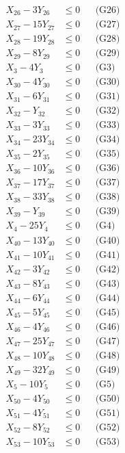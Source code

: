 \documentclass[a4paper,10pt]{article}
\begin{document}
{\begin{align}
X_{26} - 3Y_{26} &\leq 0 && \text{(G26)} \\
X_{27} - 15Y_{27} &\leq 0 && \text{(G27)} \\
X_{28} - 19Y_{28} &\leq 0 && \text{(G28)} \\
\allowbreak
X_{29} - 8Y_{29} &\leq 0 && \text{(G29)} \\
X_{3} - 4Y_{3} &\leq 0 && \text{(G3)} \\
X_{30} - 4Y_{30} &\leq 0 && \text{(G30)} \\
X_{31} - 6Y_{31} &\leq 0 && \text{(G31)} \\
X_{32} - Y_{32} &\leq 0 && \text{(G32)} \\
X_{33} - 3Y_{33} &\leq 0 && \text{(G33)} \\
X_{34} - 23Y_{34} &\leq 0 && \text{(G34)} \\
X_{35} - 2Y_{35} &\leq 0 && \text{(G35)} \\
X_{36} - 10Y_{36} &\leq 0 && \text{(G36)} \\
X_{37} - 17Y_{37} &\leq 0 && \text{(G37)} \\
X_{38} - 33Y_{38} &\leq 0 && \text{(G38)} \\
X_{39} - Y_{39} &\leq 0 && \text{(G39)} \\
X_{4} - 25Y_{4} &\leq 0 && \text{(G4)} \\
X_{40} - 13Y_{40} &\leq 0 && \text{(G40)} \\
X_{41} - 10Y_{41} &\leq 0 && \text{(G41)} \\
X_{42} - 3Y_{42} &\leq 0 && \text{(G42)} \\
X_{43} - 8Y_{43} &\leq 0 && \text{(G43)} \\
X_{44} - 6Y_{44} &\leq 0 && \text{(G44)} \\
X_{45} - 5Y_{45} &\leq 0 && \text{(G45)} \\
X_{46} - 4Y_{46} &\leq 0 && \text{(G46)} \\
\allowbreak
X_{47} - 25Y_{47} &\leq 0 && \text{(G47)} \\
X_{48} - 10Y_{48} &\leq 0 && \text{(G48)} \\
X_{49} - 32Y_{49} &\leq 0 && \text{(G49)} \\
X_{5} - 10Y_{5} &\leq 0 && \text{(G5)} \\
X_{50} - 4Y_{50} &\leq 0 && \text{(G50)} \\
X_{51} - 4Y_{51} &\leq 0 && \text{(G51)} \\
X_{52} - 8Y_{52} &\leq 0 && \text{(G52)} \\
X_{53} - 10Y_{53} &\leq 0 && \text{(G53)} \\

\end{align}}
\end{document}

